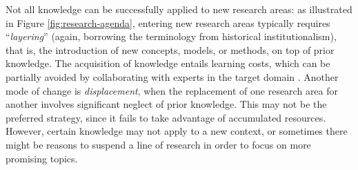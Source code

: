 \documentclass{article}
\begin{document}
Not all knowledge can be successfully applied to new research areas: %
as illustrated in Figure \ref{fig:research-agenda}, entering new research areas typically requires ``\textit{layering}'' (again, borrowing the terminology from historical institutionalism), that is, the introduction of new concepts, models, or methods, on top of prior knowledge. The acquisition of knowledge entails learning costs, which can be partially avoided by collaborating with experts in the target domain \citep{Tripodi2020}. Another mode of change is \textit{displacement}, when the replacement of one research area for another involves significant neglect of prior knowledge. %
This may not be the preferred strategy, since it fails to take advantage of accumulated resources. However, certain knowledge may not apply to a new context, or sometimes there might be reasons to suspend a line of research in order to focus on more promising topics. 
\end{document}
